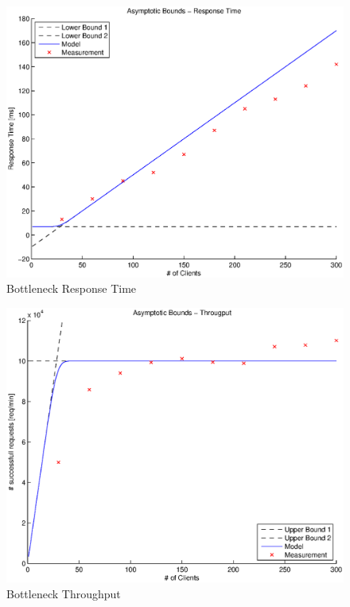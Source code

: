 \documentclass[a4paper]{article}
\begin{document}



\begin{figure}[H]
	\begin{center}
    \includegraphics[scale=0.6]{../plots-ms2-mg/bottleneck-rt.eps}
  \end{center}
  \caption{Bottleneck Response Time}
  \label{fig:bottleneck-rt}
\end{figure}




\begin{figure}[H]
	\begin{center}
    \includegraphics[scale=0.6]{../plots-ms2-mg/bottleneck-tp.eps}
  \end{center}
  \caption{Bottleneck Throughput}
  \label{fig:bottleneck-tp}
\end{figure}
\end{document}
